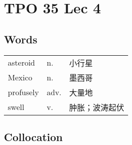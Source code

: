 \section{TPO 35 Lec 4}

\subsection{Words}

\begin{tabular}{lll}
    asteroid  & n.   & 小行星     \\
    Mexico    & n.   & 墨西哥     \\
    profusely & adv. & 大量地     \\
    swell     & v.   & 肿胀；波涛起伏 \\
\end{tabular}

\subsection{Collocation}

